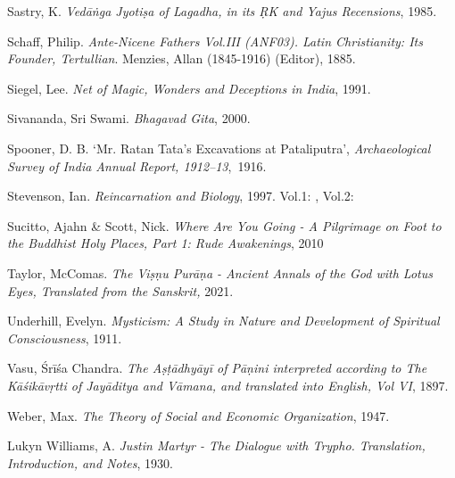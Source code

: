 \label{footprints_split_023.html_Sastryux201985}
Sastry, K. \emph{Vedāṅga Jyotiṣa of Lagadha, in its ṚK and Yajus
Recensions}, 1985.

\label{footprints_split_023.html_Schaffux201885}
Schaff, Philip. \emph{Ante-Nicene Fathers Vol.III (ANF03). Latin
Christianity: Its Founder, Tertullian}. Menzies, Allan (1845-1916)
(Editor), 1885.

\label{footprints_split_023.html_Siegelux201991}
Siegel, Lee. \emph{Net of Magic, Wonders and Deceptions in India}, 1991.

\label{footprints_split_023.html_Sivanandaux202000}
Sivananda, Sri Swami. \emph{Bhagavad Gita}, 2000.

\label{footprints_split_023.html_Spoonerux201916}
Spooner, D. B. `Mr. Ratan Tata's Excavations at Pataliputra',
\emph{Archaeological Survey of India Annual Report, 1912--13},~1916.

\label{footprints_split_023.html_Stevensonux201997}
Stevenson, Ian. \emph{Reincarnation and Biology}, 1997. Vol.1: , Vol.2:

\label{footprints_split_023.html_Sucittoux20andux20Scottux202010}
Sucitto, Ajahn \& Scott, Nick. \emph{Where Are You Going - A Pilgrimage
on Foot to the Buddhist Holy Places, Part 1: Rude Awakenings}, 2010

\label{footprints_split_023.html_Taylorux202021}
Taylor, McComas. \emph{The Viṣṇu Purāṇa - Ancient Annals of the God with
Lotus Eyes, Translated from the Sanskrit,} 2021.

\label{footprints_split_023.html_Underhillux201911}
Underhill, Evelyn. \emph{Mysticism: A Study in Nature and Development of
Spiritual Consciousness}, 1911.

\label{footprints_split_023.html_Vasuux201897b}
Vasu, Śrīśa Chandra. \emph{The Aṣṭādhyāyī of Pāṇini interpreted
according to The Kāśikāvṛtti of Jayāditya and Vāmana, and translated
into English, Vol VI}, 1897.

\label{footprints_split_023.html_Weberux201947}
Weber, Max. \emph{The Theory of Social and Economic Organization}, 1947.

\label{footprints_split_023.html_Lukynux20Williamsux201930}
Lukyn Williams, A. \emph{Justin Martyr - The Dialogue with Trypho.
Translation, Introduction, and Notes}, 1930.

\label{footprints_split_023.html_footnotes}
\label{footprints_split_023.html_calibre_pb_47}

